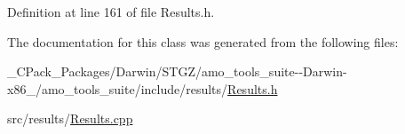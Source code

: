 Definition at line 161 of file Results.\+h.



The documentation for this class was generated from the following files\+:\begin{DoxyCompactItemize}
\item 
\+\_\+\+C\+Pack\+\_\+\+Packages/\+Darwin/\+S\+T\+G\+Z/amo\+\_\+tools\+\_\+suite-\/-\/\+Darwin-\/x86\+\_/amo\+\_\+tools\+\_\+suite/include/results/\hyperlink{___c_pack___packages_2_darwin_2_s_t_g_z_2amo__tools__suite--_darwin-x86__64_2amo__tools__suite_2include_2results_2_results_8h}{Results.\+h}\item 
src/results/\hyperlink{_results_8cpp}{Results.\+cpp}\end{DoxyCompactItemize}
